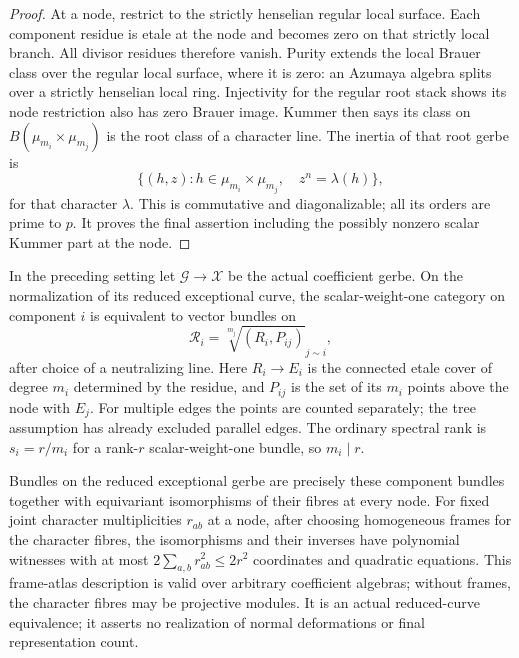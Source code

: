 \begin{proof}
At a node, restrict to the strictly henselian regular
local surface. Each component residue is etale at the
node and becomes zero on that strictly local branch.
All divisor residues therefore vanish. Purity extends
the local Brauer class over the regular local surface,
where it is zero: an Azumaya algebra splits over a
strictly henselian local ring. Injectivity for the
regular root stack shows its node restriction also has
zero Brauer image. Kummer then says its class on
$B(\mu_{m_i}\times\mu_{m_j})$ is the root class of a
character line. The inertia of that root gerbe is
\[
 \{(h,z): h\in\mu_{m_i}\times\mu_{m_j},\quad
                       z^n=\lambda(h)\},              \tag{D.TR.7}
\]
for that character $\lambda$. This is commutative and
diagonalizable; all its orders are prime to $p$.
It proves the final assertion including the possibly
nonzero scalar Kummer part at the node.
\end{proof}

\begin{lemma}
\label{D:SNC-tree-residual-category}
In the preceding setting let $\mathcal G\to\mathcal X$
be the actual coefficient gerbe. On the normalization
of its reduced exceptional curve, the scalar-weight-one
category on component $i$ is equivalent to vector bundles
on
\[
 \mathcal R_i=\sqrt[m_j]{(R_i,P_{ij})}_{j\sim i},      \tag{D.TR.8}
\]
after choice of a neutralizing line. Here $R_i\to E_i$
is the connected etale cover of degree $m_i$ determined
by the residue, and $P_{ij}$ is the set of its $m_i$
points above the node with $E_j$. For multiple edges the
points are counted separately; the tree assumption has
already excluded parallel edges. The ordinary spectral
rank is $s_i=r/m_i$ for a rank-$r$ scalar-weight-one
bundle, so $m_i\mid r$.

Bundles on the reduced exceptional gerbe are precisely
these component bundles together with equivariant
isomorphisms of their fibres at every node. For fixed
joint character multiplicities $r_{ab}$ at a node,
after choosing homogeneous frames for the character
fibres, the isomorphisms and their inverses have polynomial
witnesses with at most $2\sum_{a,b}r_{ab}^2\leq2r^2$
coordinates and quadratic equations. This frame-atlas
description is valid over arbitrary coefficient algebras;
without frames, the character fibres may be projective
modules. It is an actual
reduced-curve equivalence; it asserts no realization
of normal deformations or final representation count.
\end{lemma}

